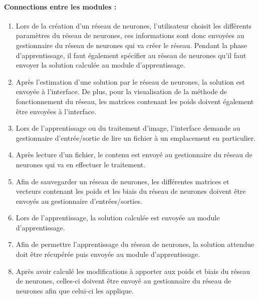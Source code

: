 \documentclass{article}
\begin{document}
	\paragraph{Connections entre les modules :}
			\begin{enumerate}
				\item Lors de la création d'un réseau de neurones, l'utilisateur choisit les différents paramètres du réseau de neurones, ces informations sont donc envoyées au gestionnaire du réseau de neurones qui va créer le réseau. Pendant la phase d'apprentissage, il faut également spécifier au réseau de neurones qu'il faut envoyer la solution calculée au module d'apprentissage.
				\item Après l'estimation d'une solution par le réseau de neurones, la solution est envoyée à l'interface. De plus, pour la visualisation de la méthode de fonctionnement du réseau, les matrices contenant les poids doivent également être envoyées à l'interface.
				\item Lors de l'apprentissage ou du traitement d'image, l'interface demande au gestionnaire d'entrée/sortie de lire un fichier à un emplacement en particulier.
				\item Après lecture d'un fichier, le contenu est envoyé au gestionnaire du réseau de neurones qui va en effectuer le traitement.
				\item Afin de sauvegarder un réseau de neurones, les différentes matrices et vecteurs contenant les poids et les biais du réseau de neurones doivent être envoyés au gestionnaire d'entrées/sorties.
				\item Lors de l'apprentissage, la solution calculée est envoyée au module d'apprentissage.
				\item Afin de permettre l'apprentissage du réseau de neurones, la solution attendue doit être récupérée puis envoyée au module d'apprentissage.
				\item Après avoir calculé les modifications à apporter aux poids et biais du réseau de neurones, celles-ci doivent être envoyé au gestionnaire du réseau de neurones afin que celui-ci les applique.
			\end{enumerate}
\end{document}
